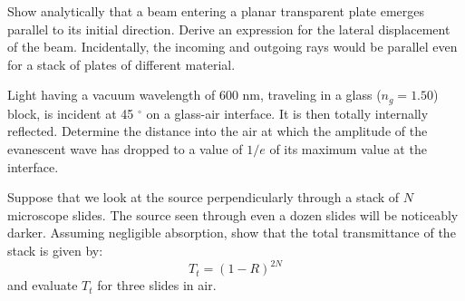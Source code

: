 \documentclass[addpoints,10pt]{exam}
\begin{document}
\begin{questions}
		{
			\question
			Show analytically that a beam entering a planar transparent plate emerges parallel to its initial direction. Derive an expression for the lateral displacement of the beam. Incidentally, the incoming and outgoing rays would be parallel even for a stack of plates of different material.
		}
		
		{
			\question
			Light having a vacuum wavelength of 600 nm, traveling in a glass ($n_g = 1.50$) block, is incident at 45 $^\circ$ on a glass-air interface. It is then totally internally reflected. Determine the distance into the air at which the amplitude of the evanescent wave has dropped to a value of $1/e$ of its maximum value at the interface.
		}
		
		{
			\question
			Suppose that we look at the source perpendicularly through a stack of $N$ microscope slides. The source seen through even a dozen slides will be noticeably darker. Assuming negligible absorption, show that the total transmittance of the stack is given by:
			\begin{equation*}
				T_t = (1-R)^{2N}
			\end{equation*}
			and evaluate $T_t$ for three slides in air.
		}
	\end{questions}
	
	
\end{document}
